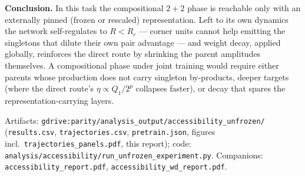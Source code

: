 \documentclass[10pt]{article}
\begin{document}
\textbf{Conclusion.} In this task the compositional $2{+}2$ phase is reachable only with an
externally pinned (frozen or rescaled) representation. Left to its own dynamics the network
self-regulates to $R<R_c$ --- corner units cannot help emitting the singletons that dilute
their own pair advantage --- and weight decay, applied globally, reinforces the direct route by
shrinking the parent amplitudes themselves. A compositional phase under joint training would
require either parents whose production does not carry singleton by-products, deeper targets
(where the direct route's $\eta\propto Q_1/2^p$ collapses faster), or decay that spares the
representation-carrying layers.

\vspace{2pt}\footnotesize
Artifacts: \texttt{gdrive:parity/analysis\_output/accessibility\_unfrozen/}
(\texttt{results.csv}, \texttt{trajectories.csv}, \texttt{pretrain.json}, figures incl.\
\texttt{trajectories\_panels.pdf}, this report); code:
\texttt{analysis/accessibility/run\_unfrozen\_experiment.py}. Companions:
\texttt{accessibility\_report.pdf}, \texttt{accessibility\_wd\_report.pdf}.
\end{document}
